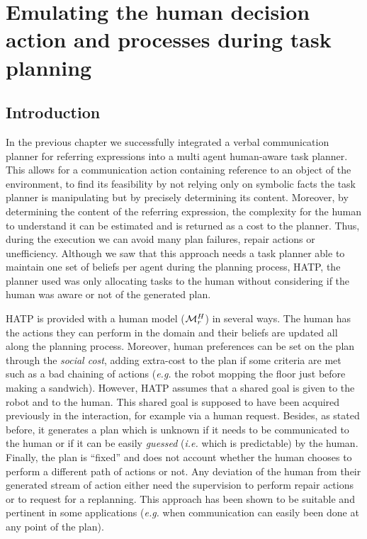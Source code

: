 \documentclass[a4paper,11pt,twoside]{StyleThese}
\begin{document}
\setcounter{chapter}{3} %
\dominitoc
\faketableofcontents
\fi

\chapter{Emulating the human decision action and processes during task planning}
\label{chapter:doublehtn}
\minitoc

\section{Introduction}
In the previous chapter we successfully integrated a verbal communication planner for referring expressions into a multi agent human-aware task planner. This allows for a communication action containing reference to an object of the environment, to find its feasibility by not relying only on symbolic facts the task planner is manipulating but by precisely determining its content. Moreover, by determining the content of the referring expression, the complexity for the human to understand it can be estimated and is returned as a cost to the planner. Thus, during the execution we can avoid many plan failures, repair actions or unefficiency. Although we saw that this approach needs a task planner able to maintain one set of beliefs per agent during the planning process, HATP, the planner used was only allocating tasks to the human without considering if the human was aware or not of the generated plan.

HATP is provided with a human model ($\mathcal{M}^H_r$) in several ways. The human has the actions they can perform in the domain and their beliefs are updated all along the planning process. Moreover, human preferences can be set on the plan through the \textit{social cost}, adding extra-cost to the plan if some criteria are met such as a bad chaining of actions (\textit{e.g.} the robot mopping the floor just before making a sandwich). However, HATP assumes that a shared goal is given to the robot and to the human. This shared goal is supposed to have been acquired previously in the interaction, for example via a human request. Besides, as stated before, it generates a plan which is unknown if it needs to be communicated to the human or if it can be easily \textit{guessed} (\textit{i.e.} which is predictable) by the human. Finally, the plan is ``fixed'' and does not account whether the human chooses to perform a different path of actions or not. Any deviation of the human from their generated stream of action either need the supervision to perform repair actions or to request for a replanning. This approach has been shown to be suitable and pertinent in some applications (\textit{e.g.} when communication can easily been done at any point of the plan).
\end{document}
